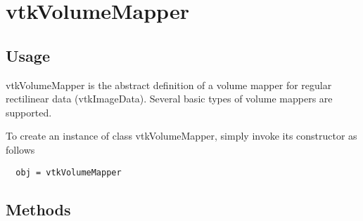 \section{vtkVolumeMapper}

\subsection{Usage}

 vtkVolumeMapper is the abstract definition of a volume mapper for regular
 rectilinear data (vtkImageData).  Several  basic types of volume mappers 
 are supported. 

To create an instance of class vtkVolumeMapper, simply
invoke its constructor as follows
\begin{verbatim}
  obj = vtkVolumeMapper
\end{verbatim}
\subsection{Methods}

